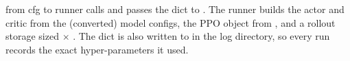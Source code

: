 \begin{isaacbox}{from cfg to runner}
 calls  and passes the dict
to . The runner builds
the actor and critic from the (converted) model configs, the PPO object from
, and a rollout storage sized  $\times$
. The dict is also written to
 in the log directory, so every run records the exact
hyper-parameters it used.
\end{isaacbox}
